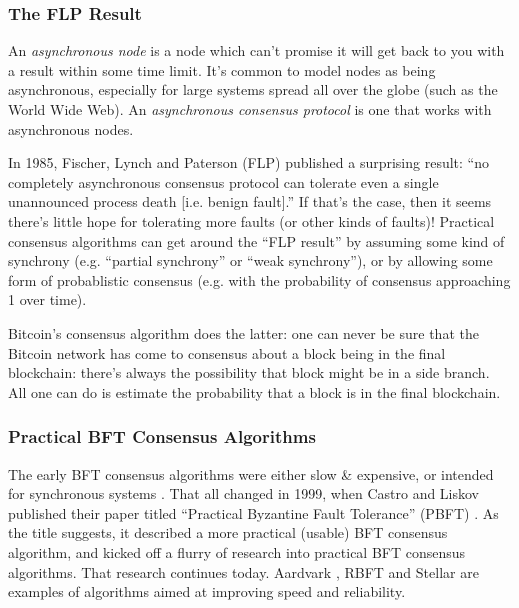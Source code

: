 \subsubsection{The FLP Result}
An \emph{asynchronous node} is a node which can't promise it will get back to you with a result within some time limit. It's common to model nodes as being asynchronous, especially for large systems spread all over the globe (such as the World Wide Web). An \emph{asynchronous consensus protocol} is one that works with asynchronous nodes.

In 1985, Fischer, Lynch and Paterson (FLP) published a surprising result: ``no completely asynchronous consensus protocol can tolerate even a single unannounced process death [i.e. benign fault].'' \cite{fischer1985impossibility} If that's the case, then it seems there's little hope for tolerating more faults (or other kinds of faults)! Practical consensus algorithms can get around the ``FLP result'' by assuming some kind of synchrony (e.g. ``partial synchrony'' or ``weak synchrony''), or by allowing some form of probablistic consensus (e.g. with the probability of consensus approaching 1 over time).

Bitcoin's consensus algorithm does the latter: one can never be sure that the Bitcoin network has come to consensus about a block being in the final blockchain: there's always the possibility that block might be in a side branch. All one can do is estimate the probability that a block is in the final blockchain.

\subsubsection{Practical BFT Consensus Algorithms}
The early BFT consensus algorithms were either slow \& expensive, or intended for synchronous systems \cite{wiki_byzantine,paulitsch2005coverage,hopkins1987evolution,driscoll1983multi}. That all changed in 1999, when Castro and Liskov published their paper titled ``Practical Byzantine Fault Tolerance'' (PBFT) \cite{castro1999practical,castro2001byzantine}. As the title suggests, it described a more practical (usable) BFT consensus algorithm, and kicked off a flurry of research into practical BFT consensus algorithms.
That research continues today. Aardvark \cite{clement2009making}, RBFT \cite{aublin2013rbft} and Stellar \cite{mazieres2015stellar} are examples of algorithms aimed at improving speed and reliability.


